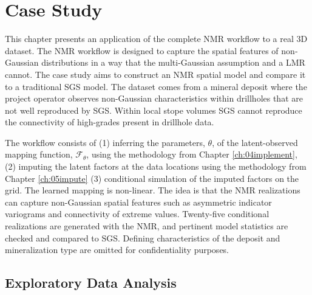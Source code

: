 
\chapter{Case Study}
\label{ch:06casestudy}

This chapter presents an application of the complete \gls{NMR} workflow to a real \gls{3D} dataset. The \gls{NMR} workflow is designed to capture the spatial features of non‐Gaussian distributions in a way that the multi-Gaussian assumption and a \gls{LMR} cannot. The case study aims to construct an \gls{NMR} spatial model and compare it to a traditional \gls{SGS} model. The dataset comes from a mineral deposit where the project operator observes non-Gaussian characteristics within drillholes that are not well reproduced by \gls{SGS}. Within local stope volumes \gls{SGS} cannot reproduce the connectivity of high-grades present in drillhole data.

The workflow consists of (1) inferring the parameters, $\theta$, of the latent-observed mapping function, $\mathcal{F}_{\theta}$, using the methodology from Chapter \ref{ch:04implement}, (2) imputing the latent factors at the data locations using the methodology from Chapter \ref{ch:05impute} (3) conditional simulation of the imputed factors on the grid. The learned mapping is non-linear. The idea is that the \gls{NMR} realizations can capture non-Gaussian spatial features such as asymmetric indicator variograms and connectivity of extreme values. Twenty-five conditional realizations are generated with the \gls{NMR}, and pertinent model statistics are checked and compared to \gls{SGS}. Defining characteristics of the deposit and mineralization type are omitted for confidentiality purposes.

\FloatBarrier
\section{Exploratory Data Analysis}
\label{sec:06eda}

